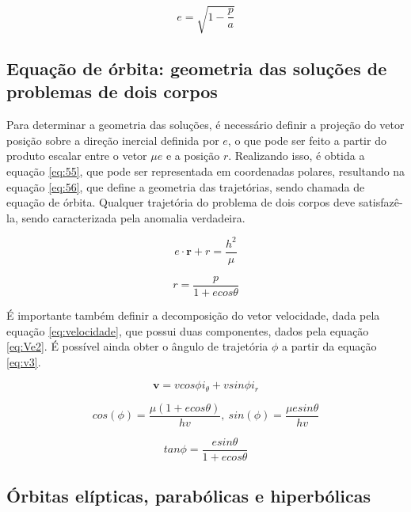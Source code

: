 \begin{equation}
    e = \sqrt{1-\frac{p}{a}}
    \label{eq:54}
\end{equation}

\subsection{Equação de órbita: geometria das soluções de problemas de dois corpos}

Para determinar a geometria das soluções, é necessário definir a projeção do vetor posição sobre a direção inercial definida por $e$, o que pode ser feito a partir do produto escalar entre o vetor $\mu e$ e a posição $r$. Realizando isso, é obtida a equação \ref{eq:55}, que pode ser representada em coordenadas polares, resultando na equação \ref{eq:56}, que define a geometria das trajetórias, sendo chamada de equação de órbita. Qualquer trajetória do problema de dois corpos deve satisfazê-la, sendo caracterizada pela anomalia verdadeira. 

\begin{equation}
e \cdot \textbf{r} + r = \frac{h^{2}}{\mu}
    \label{eq:55}
\end{equation}

\begin{equation}
    r = \frac{p}{1+ecos\theta}
\label{eq:56}
\end{equation}

É importante também definir a decomposição do vetor velocidade, dada pela equação \ref{eq:velocidade}, que possui duas componentes, dados pela equação \ref{eq:Ve2}. É possível ainda obter o ângulo de trajetória $\phi$ a partir da equação \ref{eq:v3}.


\begin{equation}
    \textbf{v} = vcos\phi i_{\theta} + vsin\phi i_{r}
    \label{eq:velocidade}
\end{equation}

\begin{equation}
    cos (\phi) = \frac{\mu (1+ecos\theta)}{hv}, \ sin (\phi) = \frac{\mu e sin\theta}{hv}
    \label{eq:Ve2}
\end{equation}

\begin{equation}
    tan\phi = \frac{esin\theta}{1+ecos\theta}
    \label{eq:v3}
\end{equation}


\subsection{Órbitas elípticas, parabólicas e hiperbólicas}

